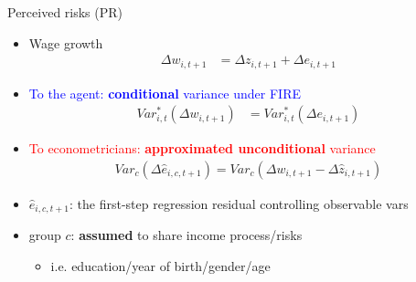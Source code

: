 \documentclass{beamer}
\begin{document}
\begin{frame}{Perceived risks (PR)}
	\begin{itemize}
		\item Wage growth 
		\begin{equation*}
			\begin{split}
				\Delta w_{i,t+1} & =\Delta z_{i,t+1} +\Delta e_{i,t+1} 
			\end{split}
		\end{equation*}
		\pause 
		\item \textcolor{blue}{To the agent: \textbf{conditional} variance under FIRE}
		\begin{equation*}
			\begin{split}
				Var^*_{i,t}(\Delta w_{i,t+1}) & =Var^*_{i,t}(\Delta e_{i,t+1})
			\end{split}
		\end{equation*}
		\pause 
		\item \textcolor{red}{To econometricians: \textbf{approximated unconditional} variance} 
		\begin{equation*}
			\begin{split}
				Var_c(\Delta \hat e_{i,c,t+1})     = 	Var_c(\Delta w_{i,t+1} - \Delta \hat z_{i,t+1} )
			\end{split}
		\end{equation*}
		\item $\hat e_{i,c,t+1}$: the first-step regression residual controlling observable vars
		\item group $c$: \textbf{assumed} to share income process/risks
		\begin{itemize}
			\item i.e. education/year of birth/gender/age
		\end{itemize}
		

\end{itemize}
\end{frame}
\end{document}
